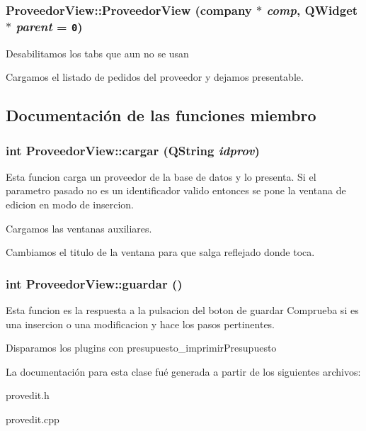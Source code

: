 \subsubsection{\setlength{\rightskip}{0pt plus 5cm}Proveedor\-View::Proveedor\-View ({\bf company} $\ast$ {\em comp}, QWidget $\ast$ {\em parent} = {\tt 0})}\label{classProveedorView_a2}


Desabilitamos los tabs que aun no se usan

Cargamos el listado de pedidos del proveedor y dejamos presentable. 

\subsection{Documentaci\'{o}n de las funciones miembro}
\subsubsection{\setlength{\rightskip}{0pt plus 5cm}int Proveedor\-View::cargar (QString {\em idprov})\hspace{0.3cm}{\tt  [virtual]}}\label{classProveedorView_a0}


Esta funcion carga un proveedor de la base de datos y lo presenta. Si el parametro pasado no es un identificador valido entonces se pone la ventana de edicion en modo de insercion.

Cargamos las ventanas auxiliares.

Cambiamos el titulo de la ventana para que salga reflejado donde toca. 
\subsubsection{\setlength{\rightskip}{0pt plus 5cm}int Proveedor\-View::guardar ()\hspace{0.3cm}{\tt  [virtual]}}\label{classProveedorView_a1}


Esta funcion es la respuesta a la pulsacion del boton de guardar Comprueba si es una insercion o una modificacion y hace los pasos pertinentes.

Disparamos los plugins con presupuesto\_\-imprimir\-Presupuesto 

La documentaci\'{o}n para esta clase fu\'{e} generada a partir de los siguientes archivos:\begin{CompactItemize}
\item 
provedit.h\item 
provedit.cpp\end{CompactItemize}
